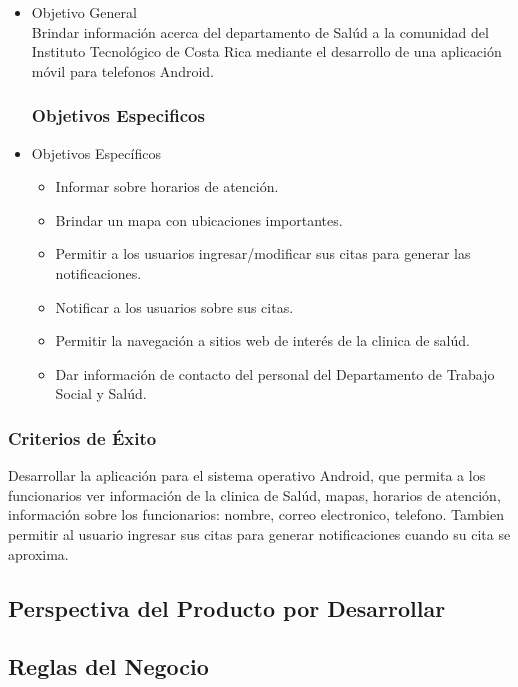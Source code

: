 \documentclass[12pt]{article}
\begin{document}
\begin{itemize}
\item{Objetivo General}
\\[0.1in]
Brindar informaci\'on acerca del departamento de Sal\'ud a la comunidad del Instituto Tecnol\'ogico de Costa Rica mediante el desarrollo de una aplicaci\'on m\'ovil para telefonos Android.

\subsubsection{Objetivos Especificos}

\item{Objetivos Espec\'ificos}
\begin{itemize}
	\item{Informar sobre horarios de atenci\'on.}
	\item{Brindar un mapa con ubicaciones importantes.}
	\item{Permitir a los usuarios ingresar/modificar sus citas para generar las notificaciones.}
	\item{Notificar a los usuarios sobre sus citas.}
	\item{Permitir la navegaci\'on a sitios web de inter\'es de la clinica de sal\'ud.}
	\item{Dar informaci\'on de contacto del personal del Departamento de Trabajo Social y Sal\'ud.}
\end{itemize}
\end{itemize}

\subsubsection{Criterios de \'Exito}
Desarrollar la aplicaci\'on para el sistema operativo Android, que permita a los funcionarios ver informaci\'on de la clinica de Sal\'ud, mapas, horarios de atenci\'on, informaci\'on sobre los funcionarios: nombre, correo electronico, telefono. Tambien permitir al usuario ingresar sus citas para generar notificaciones cuando su cita se aproxima.

\subsection{Perspectiva del Producto por Desarrollar}

\subsection{Reglas del Negocio}
\end{document}
